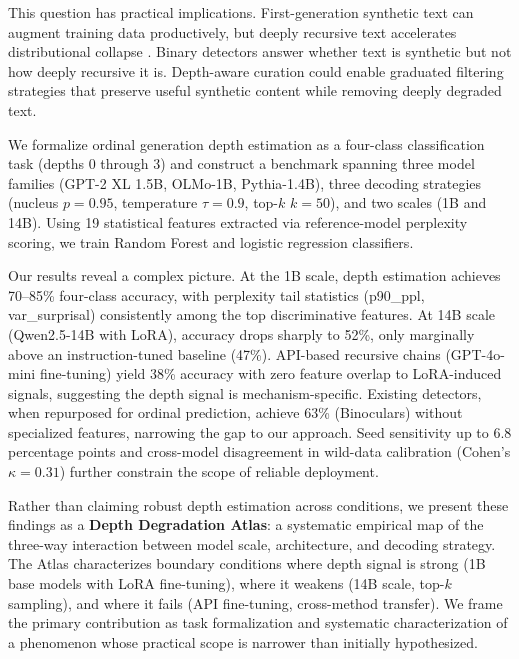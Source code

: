 \documentclass[11pt,a4paper]{article}
\begin{document}
This question has practical implications. First-generation synthetic text can augment training data productively, but deeply recursive text accelerates distributional collapse \citep{alemohammad2024selfconsuming}. Binary detectors \citep{hans2024binoculars, bao2024fastdetectgpt} answer whether text is synthetic but not how deeply recursive it is. Depth-aware curation could enable graduated filtering strategies that preserve useful synthetic content while removing deeply degraded text.

We formalize ordinal generation depth estimation as a four-class classification task (depths 0 through 3) and construct a benchmark spanning three model families (GPT-2 XL 1.5B, OLMo-1B, Pythia-1.4B), three decoding strategies (nucleus $p{=}0.95$, temperature $\tau{=}0.9$, top-$k$ $k{=}50$), and two scales (1B and 14B). Using 19 statistical features extracted via reference-model perplexity scoring, we train Random Forest and logistic regression classifiers.

Our results reveal a complex picture. At the 1B scale, depth estimation achieves 70--85\% four-class accuracy, with perplexity tail statistics (p90\_ppl, var\_surprisal) consistently among the top discriminative features. At 14B scale (Qwen2.5-14B with LoRA), accuracy drops sharply to 52\%, only marginally above an instruction-tuned baseline (47\%). API-based recursive chains (GPT-4o-mini fine-tuning) yield 38\% accuracy with zero feature overlap to LoRA-induced signals, suggesting the depth signal is mechanism-specific. Existing detectors, when repurposed for ordinal prediction, achieve 63\% (Binoculars) without specialized features, narrowing the gap to our approach. Seed sensitivity up to 6.8 percentage points and cross-model disagreement in wild-data calibration (Cohen's $\kappa = 0.31$) further constrain the scope of reliable deployment.

Rather than claiming robust depth estimation across conditions, we present these findings as a \textbf{Depth Degradation Atlas}: a systematic empirical map of the three-way interaction between model scale, architecture, and decoding strategy. The Atlas characterizes boundary conditions where depth signal is strong (1B base models with LoRA fine-tuning), where it weakens (14B scale, top-$k$ sampling), and where it fails (API fine-tuning, cross-method transfer). We frame the primary contribution as task formalization and systematic characterization of a phenomenon whose practical scope is narrower than initially hypothesized.
\end{document}
